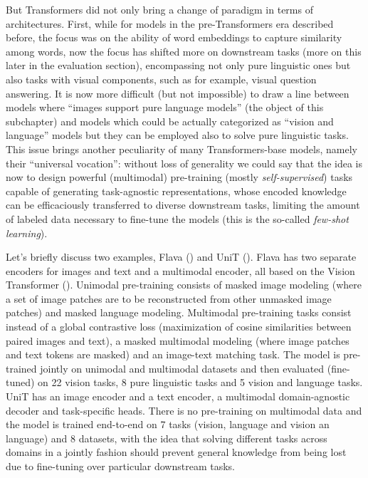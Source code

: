 \documentclass[
]{krantz}
\begin{document}
But Transformers did not only bring a change of paradigm in terms of architectures. First, while for models in the pre-Transformers era described before, the focus was on the ability of word embeddings to capture similarity among words, now the focus has shifted more on downstream tasks (more on this later in the evaluation section), encompassing not only pure linguistic ones but also tasks with visual components, such as for example, visual question answering. It is now more difficult (but not impossible) to draw a line between models where ``images support pure language models'' (the object of this subchapter) and models which could be actually categorized as ``vision and language'' models but they can be employed also to solve pure linguistic tasks. This issue brings another peculiarity of many Transformers-base models, namely their ``universal vocation'': without loss of generality we could say that the idea is now to design powerful (multimodal) pre-training (mostly \emph{self-supervised}) tasks capable of generating task-agnostic representations, whose encoded knowledge can be efficaciously transferred to diverse downstream tasks, limiting the amount of labeled data necessary to fine-tune the models (this is the so-called \emph{few-shot learning}).

Let's briefly discuss two examples, Flava (\citet{singh2022flava}) and UniT (\citet{hu2021unit}). Flava has two separate encoders for images and text and a multimodal encoder, all based on the Vision Transformer (\citet{dosovitskiy2020image}). Unimodal pre-training consists of masked image modeling (where a set of image patches are to be reconstructed from other unmasked image patches) and masked language modeling. Multimodal pre-training tasks consist instead of a global contrastive loss (maximization of cosine similarities between paired images and text), a masked multimodal modeling (where image patches and text tokens are masked) and an image-text matching task. The model is pre-trained jointly on unimodal and multimodal datasets and then evaluated (fine-tuned) on 22 vision tasks, 8 pure linguistic tasks and 5 vision and language tasks.\\
UniT has an image encoder and a text encoder, a multimodal domain-agnostic decoder and task-specific heads. There is no pre-training on multimodal data and the model is trained end-to-end on 7 tasks (vision, language and vision an language) and 8 datasets, with the idea that solving different tasks across domains in a jointly fashion should prevent general knowledge from being lost due to fine-tuning over particular downstream tasks.
\end{document}
